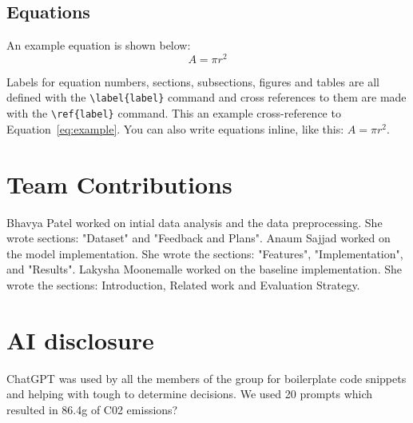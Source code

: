 \documentclass[11pt]{article}
\begin{document}
\subsection{Equations}

An example equation is shown below:
\begin{equation}
  \label{eq:example}
  A = \pi r^2
\end{equation}

Labels for equation numbers, sections, subsections, figures and tables
are all defined with the \verb|\label{label}| command and cross references
to them are made with the \verb|\ref{label}| command.
This an example cross-reference to Equation~\ref{eq:example}. You can also write equations inline, like this: $A=\pi r^2$.


\fi

\section*{Team Contributions}

Bhavya Patel worked on intial data analysis and the data preprocessing. She wrote sections: "Dataset" and "Feedback and Plans".
Anaum Sajjad worked on the model implementation. She wrote the sections: "Features", "Implementation", and "Results". Lakysha Moonemalle worked on the baseline implementation. She wrote the sections: Introduction, Related work and Evaluation Strategy.  
%

\section*{AI disclosure}
ChatGPT was used by all the members of the group for boilerplate code snippets and helping with tough to determine decisions. We used 20 prompts which resulted in  86.4g of C02 emissions?


\citet{kwon2019}

\citep{golovenkin2020}

\citet{yavru2022}

\citet{makhmudov2025}

\citet{caruana1997}



\end{document}
